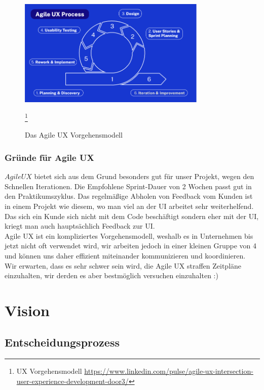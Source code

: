 \documentclass[12pt,a4paper]{scrartcl}
\begin{document}
\begin{figure}[h]
    \centering
    \includegraphics[width=0.8\textwidth]{images/AgileUX}
    \caption[Abbildung: Agile UX Vorgehen]{Das Agile UX Vorgehensmodell}
    \footnote{UX Vorgehensmodell \url{https://www.linkedin.com/pulse/agile-ux-intersection-user-experience-development-door3/}}
    
\end{figure}


\subsubsection{Gründe für Agile UX}

$Agile UX$ bietet sich aus dem Grund besonders gut für unser Projekt, wegen den Schnellen Iterationen. Die Empfohlene Sprint-Dauer von 2 Wochen passt gut in den Praktikumszyklus.   Das regelmäßige Abholen von Feedback vom Kunden ist in einem Projekt wie diesem, wo man viel an der UI arbeitet sehr weiterhelfend. Das sich ein Kunde sich nicht mit dem Code beschäftigt sondern eher mit der UI, kriegt man auch hauptsächlich Feedback zur UI. \\
Agile UX ist ein kompliziertes Vorgehensmodell, weshalb es in Unternehmen bis jetzt nicht oft verwendet wird, wir arbeiten jedoch in einer kleinen Gruppe von 4 und können uns daher effizient miteinander kommunizieren und koordinieren. \\
Wir erwarten, dass es sehr schwer sein wird, die Agile UX straffen Zeitpläne einzuhalten, wir derden es aber bestmöglich versuchen einzuhalten :)


\section{Vision}

\subsection{Entscheidungsprozess}
\end{document}
